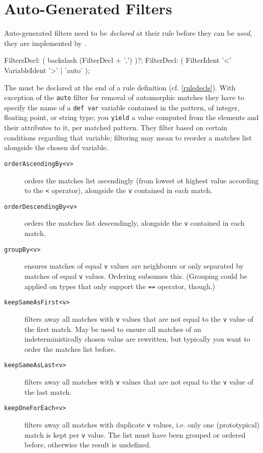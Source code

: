 \section{Auto-Generated Filters}

Auto-generated filters need to be \emph{declared} at their rule before they can be \emph{used}, they are implemented by \GrG.

\begin{rail}
  FiltersDecl: ( backslash (FilterDecl + ',') )?;
  FilterDecl: ( FilterIdent '<' VariableIdent '>' | 'auto' );
\end{rail}

The  must be declared at the end of a rule definition (cf. \ref{ruledecls}).
With exception of the \texttt{auto} filter for removal of automorphic matches they have to specify the name of a \texttt{def var} variable contained in the pattern, of integer, floating point, or string type; you \texttt{yield} a value computed from the elements and their attributes to it, per matched pattern.
They filter based on certain conditions regarding that variable; filtering may mean to reorder a matches list alongside the chosen def variable.

\begin{description}
\item[\texttt{orderAscendingBy<v>}] orders the matches list ascendingly (from lowest ot highest value according to the \verb#<# operator), alongside the \texttt{v} contained in each match.
\item[\texttt{orderDescendingBy<v>}] orders the matches list descendingly, alongside the \texttt{v} contained in each match.
\item[\texttt{groupBy<v>}] ensures matches of equal \texttt{v} values are neighbours or only separated by matches of equal \texttt{v} values. Ordering subsumes this. (Grouping could be applied on types that only support the \verb#==# operator, though.)
\item[\texttt{keepSameAsFirst<v>}] filters away all matches with \texttt{v} values that are not equal to the \texttt{v} value of the first match. May be used to ensure all matches of an indeterministically chosen value are rewritten, but typically you want to order the matches list before.
\item[\texttt{keepSameAsLast<v>}] filters away all matches with \texttt{v} values that are not equal to the \texttt{v} value of the last match.
\item[\texttt{keepOneForEach<v>}] filters away all matches with duplicate \texttt{v} values, i.e. only one (prototypical) match is kept per \texttt{v} value. The list must have been grouped or ordered before, otherwise the result is undefined.
\end{description}
 
